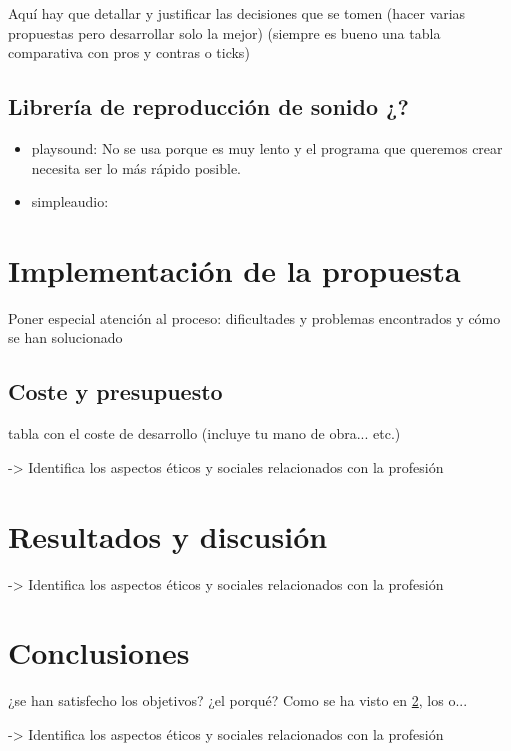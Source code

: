 \documentclass{article}
\begin{document}
 Aquí hay que detallar y justificar las decisiones que se tomen (hacer varias propuestas pero desarrollar solo la mejor) (siempre es bueno una tabla comparativa con pros y contras o ticks)
 
 \subsection{Librería de reproducción de sonido ¿?}
 \begin{itemize}
     \item playsound\cite{playsound}: No se usa porque es muy lento y el programa que queremos crear necesita ser lo más rápido posible.
     \item simpleaudio\cite{simpleaudio}:
 \end{itemize} 
 
 
\section{Implementación de la propuesta}

 Poner especial atención al proceso: dificultades y problemas encontrados y cómo se han solucionado
 
 
 \subsection{Coste y presupuesto}
  
  tabla con el coste de desarrollo (incluye tu mano de obra... etc.)
  
->  Identifica los aspectos éticos y sociales relacionados con la profesión

 
\section{Resultados y discusión}\label{sec:ResultadosDisc}

-> Identifica los aspectos éticos y sociales relacionados con la profesión

\section{Conclusiones}

 ¿se han satisfecho los objetivos? ¿el porqué? Como se ha visto en \ref{sec:ResultadosDisc}, los o...
 
-> Identifica los aspectos éticos y sociales relacionados con la profesión





\end{document}
